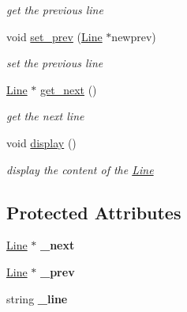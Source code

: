 \begin{DoxyCompactItemize}
\begin{DoxyCompactList}\small\item\em get the previous line \end{DoxyCompactList}\item 
\mbox{\label{class_line_abf7301d0514bf6dafdc9da9ad79a4341}} 
void \mbox{\hyperlink{class_line_abf7301d0514bf6dafdc9da9ad79a4341}{set\+\_\+prev}} (\mbox{\hyperlink{class_line}{Line}} $\ast$newprev)
\begin{DoxyCompactList}\small\item\em set the previous line \end{DoxyCompactList}\item 
\mbox{\label{class_line_a51b6d0f3c36a6aefb03be582277ca570}} 
\mbox{\hyperlink{class_line}{Line}} $\ast$ \mbox{\hyperlink{class_line_a51b6d0f3c36a6aefb03be582277ca570}{get\+\_\+next}} ()
\begin{DoxyCompactList}\small\item\em get the next line \end{DoxyCompactList}\item 
\mbox{\label{class_line_a2f138ac1c387679c8569c4b5bf06a0f9}} 
void \mbox{\hyperlink{class_line_a2f138ac1c387679c8569c4b5bf06a0f9}{display}} ()
\begin{DoxyCompactList}\small\item\em display the content of the \mbox{\hyperlink{class_line}{Line}} \end{DoxyCompactList}\end{DoxyCompactItemize}
\subsection*{Protected Attributes}
\begin{DoxyCompactItemize}
\item 
\mbox{\label{class_line_aa37e3e0b9ec8180ba796fcd970186437}} 
\mbox{\hyperlink{class_line}{Line}} $\ast$ {\bfseries \+\_\+next}
\item 
\mbox{\label{class_line_a13163a448797ff8bc4f113202a6d4d4a}} 
\mbox{\hyperlink{class_line}{Line}} $\ast$ {\bfseries \+\_\+prev}
\item 
\mbox{\label{class_line_a41059923f5c8e5a0f4f44d84bd8762aa}} 
string {\bfseries \+\_\+line}
\end{DoxyCompactItemize}


